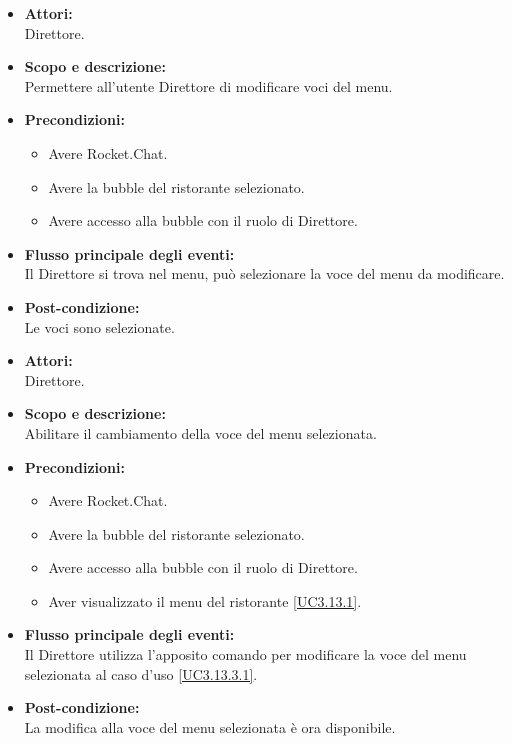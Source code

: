 \begin{itemize}
	\item \textbf{Attori:}
	\\Direttore.
	\item \textbf{Scopo e descrizione:} 
	\\Permettere all'utente Direttore di modificare voci del menu.
	\item \textbf{Precondizioni:}
	\begin{itemize}
		\item Avere Rocket.Chat.
		\item Avere la bubble del ristorante selezionato.
		\item Avere accesso alla bubble con il ruolo di Direttore.
	\end{itemize}
	\item \textbf{Flusso principale degli eventi:}
	\\Il Direttore si trova nel menu, può selezionare la voce del menu da modificare.
	\item \textbf{Post-condizione:}
	\\Le voci sono selezionate.
\end{itemize}


\begin{itemize}
	\item \textbf{Attori:}
	\\Direttore.
	\item \textbf{Scopo e descrizione:} 
	\\Abilitare il cambiamento della voce del menu selezionata.
	\item \textbf{Precondizioni:}
	\begin{itemize}
		\item Avere Rocket.Chat.
		\item Avere la bubble del ristorante selezionato.
		\item Avere accesso alla bubble con il ruolo di Direttore.
		\item Aver visualizzato il menu del ristorante \ref{UC3.13.1}.
	\end{itemize}
	\item \textbf{Flusso principale degli eventi:}
	\\Il Direttore utilizza l'apposito comando per modificare la voce del menu selezionata al caso d'uso \ref{UC3.13.3.1}.
	\item \textbf{Post-condizione:}
	\\La modifica alla voce del menu selezionata è ora disponibile.
\end{itemize}

